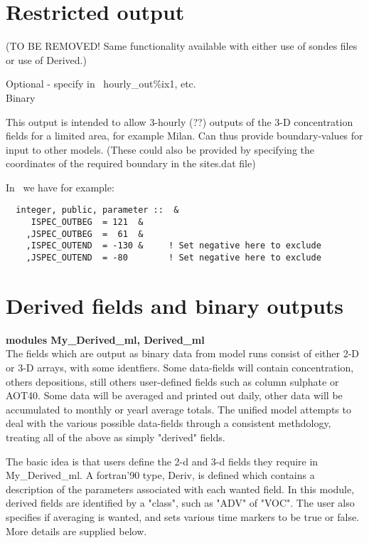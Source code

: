 \section{Restricted output}
(TO BE REMOVED! Same functionality available with either use of
sondes files or use of Derived.)

\noindent
Optional -  specify in \MyOutputs\, hourly\_out\%ix1, etc.\\
Binary
\vspace{1cm}

This output is intended to allow 3-hourly (??) outputs of the 3-D concentration
fields for a limited area, for example Milan. Can thus provide boundary-values
for input to other models. (These could also be provided by specifying the
coordinates of the required boundary in the sites.dat file)

In \MyOutputs\ we have for example:

\begin{small}\begin{verbatim}
  integer, public, parameter ::  &
	 ISPEC_OUTBEG  = 121  &
	,JSPEC_OUTBEG  =  61  &
	,ISPEC_OUTEND  = -130 &     ! Set negative here to exclude
	,JSPEC_OUTEND  = -80        ! Set negative here to exclude
\end{verbatim}
\end{small}


\section{Derived fields and binary outputs}

{\bf modules My\_Derived\_ml, Derived\_ml}\\

\noindent
The fields which are output as binary data from model runs consist
of either 2-D or 3-D  arrays, with some identfiers. 
Some data-fields will contain concentration, others depositions, still
others user-defined fields such as column sulphate or AOT40.
Some data will be averaged and printed out daily, other data will
be accumulated to monthly or yearl average totals.
The unified model 
attempts to deal with the various possible data-fields through
a consistent methdology, treating all of the above as simply "derived"
fields.

The basic idea is that users define the 2-d and 3-d fields they require
in My\_Derived\_ml. A fortran'90 type, Deriv, is defined which contains
a description of the parameters associated with each wanted field.
In this module, derived fields are identified by a "class", such as "ADV" of "VOC".
The user also specifies if averaging is wanted, and sets various
time markers to be true or false. More details are supplied below.

